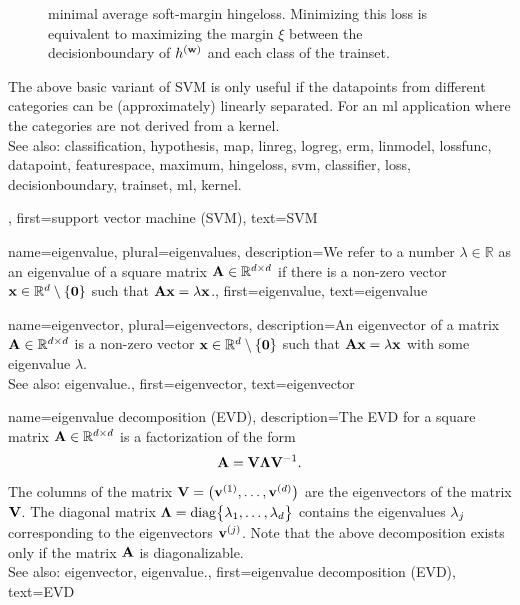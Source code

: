 {{\begin{figure}[H]
\begin{center}
{					minimal average soft-margin \gls{hingeloss}. Minimizing this \gls{loss} is equivalent 
					to maximizing the margin $\xi$ between the \gls{decisionboundary} of $h^{({\bf w})}$ 
					and each class of the \gls{trainset}.}
				\label{fig_svm_gls_dict}
			\end{center}
		\end{figure}
		The above basic variant of SVM is only useful if the \glspl{datapoint} from different categories can be  
		(approximately) linearly separated. For an \gls{ml} application where the categories are not 
		derived from a \gls{kernel}.
				\\
		See also: \gls{classification}, \gls{hypothesis}, \gls{map}, \gls{linreg}, \gls{logreg}, \gls{erm}, \gls{linmodel}, \gls{lossfunc}, \gls{datapoint}, \gls{featurespace}, \gls{maximum}, \gls{hingeloss}, \gls{svm}, \gls{classifier}, \gls{loss}, \gls{decisionboundary}, \gls{trainset}, \gls{ml}, \gls{kernel}.},
	first={support vector machine (SVM)},
	text={SVM} 
}

{name={eigenvalue}, plural={eigenvalues}, 
	description={We refer to a 
		number $\lambda \in \mathbb{R}$ as an eigenvalue of a square matrix $\mathbf{A} \in \mathbb{R}^{d \times d}$ 
		if there is a non-zero vector ${\bf x} \in \mathbb{R}^{d} \setminus \{ \mathbf{0} \}$ such that $\mathbf{A} {\bf x} = \lambda {\bf x}$.},
	first={eigenvalue},
	text={eigenvalue} 
}
	
{name={eigenvector}, plural={eigenvectors}, 
	description={An 
		eigenvector of a matrix $\mathbf{A} \in \mathbb{R}^{d \times d}$ 
		is a non-zero vector ${\bf x} \in \mathbb{R}^{d} \setminus \{ \mathbf{0} \}$ 
		such that $\mathbf{A} {\bf x} = \lambda {\bf x}$ with some \gls{eigenvalue} $\lambda$.
				\\
		See also: \gls{eigenvalue}.},
	first={eigenvector},
	text={eigenvector} 
}

{name={eigenvalue decomposition (EVD)}, 
	description={The EVD
		for a square matrix ${\bf A} \in \mathbb{R}^{d \times d}$ 
		is a factorization of the form 
		$${\bf A} = \mathbf{V} {\bm \Lambda} \mathbf{V}^{-1}.$$ 
		The columns of the matrix $\mathbf{V} = \big( {\bf v}^{(1)},\ldots,{\bf v}^{(d)} \big)$ are the 
		\glspl{eigenvector} of the matrix $\mathbf{V}$. The diagonal matrix 
		${\bm \Lambda} = {\rm diag} \big\{ \lambda_{1},\ldots,\lambda_{d} \big\}$ 
		contains the \glspl{eigenvalue} $\lambda_{j}$ corresponding to the \glspl{eigenvector} ${\bf v}^{(j)}$. 
		Note that the above decomposition exists only if the matrix ${\bf A}$ is diagonalizable.
				\\
		See also: \gls{eigenvector}, \gls{eigenvalue}.},
	first={eigenvalue decomposition (EVD)},
	text={EVD} 
}

